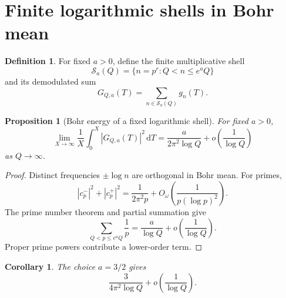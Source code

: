 \documentclass[11pt]{amsart}
\numberwithin{equation}{section}
\theoremstyle{plain}
\newtheorem{proposition}[theorem]{Proposition}
\newtheorem{corollary}[theorem]{Corollary}
\theoremstyle{definition}
\newtheorem{definition}[theorem]{Definition}
\theoremstyle{remark}
\newcommand{\1}{\mathbf{1}}
\newcommand{\dd}{\,\mathrm{d}}
\begin{document}
\section{Finite logarithmic shells in Bohr mean}
\label{sec:shell_calculation}

\begin{definition}
\label{def:short_shell}
For fixed \(a>0\), define the finite multiplicative shell
\begin{equation}
\mathcal S_a(Q)
=
\{n=p^r:Q<n\leq e^aQ\}
\label{eq:short_shell}
\end{equation}
and its demodulated sum
\begin{equation}
G_{Q,a}(T)
=
\sum_{n\in\mathcal S_a(Q)}g_n(T).
\label{eq:shell_sum}
\end{equation}
\end{definition}

\begin{proposition}[Bohr energy of a fixed logarithmic shell]
\label{prop:shell_energy}
For fixed \(a>0\),
\begin{equation}
\lim_{X\to\infty}
\frac1X\int_0^X|G_{Q,a}(T)|^2\dd T
=
\frac{a}{2\pi^2\log Q}
+
o\left(\frac1{\log Q}\right)
\label{eq:shell_energy}
\end{equation}
as \(Q\to\infty\).
\end{proposition}

\begin{proof}
Distinct frequencies \(\pm\log n\) are orthogonal in Bohr mean.  For
primes,
\begin{equation}
|c_p^-|^2+|c_p^+|^2
=
\frac1{2\pi^2p}
+
O_\omega\left(\frac1{p(\log p)^2}\right).
\label{eq:ordinary_prime_energy}
\end{equation}
The prime number theorem and partial summation give \cite{Davenport2000,IwaniecKowalski2004}
\begin{equation}
\sum_{Q<p\leq e^aQ}\frac1p
=
\frac{a}{\log Q}
+
o\left(\frac1{\log Q}\right).
\label{eq:prime_shell_reciprocals}
\end{equation}
Proper prime powers contribute a lower-order term.
\end{proof}

\begin{corollary}
\label{cor:three_half_shell}
The choice \(a=3/2\) gives
\begin{equation}
\frac{3}{4\pi^2\log Q}
+
o\left(\frac1{\log Q}\right).
\label{eq:three_half_shell}
\end{equation}
\end{corollary}
\end{document}
